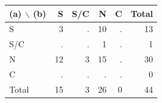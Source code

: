 \begin{center}\small
\begin{tabular}{@{}lrrrrr@{}}\toprule
(a) $\backslash$ (b) & S & S/C & N & C & Total \\ \midrule
S & 3 & . & 10 & . & 13 \\
S/C & . & . & 1 & . & 1 \\
N & 12 & 3 & 15 & . & 30 \\
C & . & . & . & . & 0 \\
\midrule Total & 15 & 3 & 26 & 0 & 44 \\
\bottomrule\end{tabular}\end{center}
